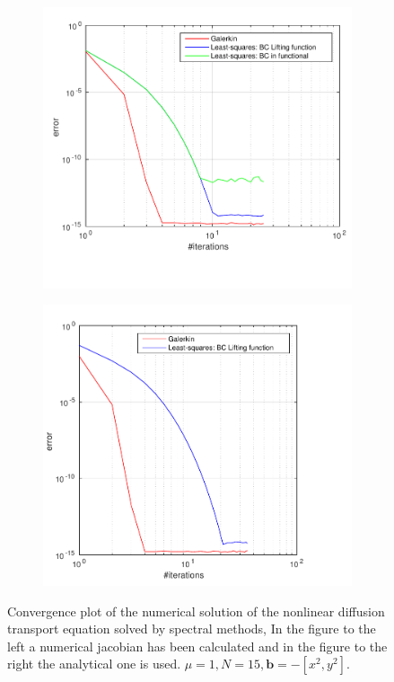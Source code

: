 \begin{figure}[h]
  \centering
  \begin{subfigure}[b]{0.48\textwidth}
	\includegraphics[width=\textwidth]{Figures/Spec_Nonlin_Convergence_Jnum.pdf}
  \end{subfigure}%
  \quad
  \begin{subfigure}[b]{0.48\textwidth}
	\includegraphics[width=\textwidth]{Figures/Spec_Nonlin_Convergence.pdf}
  \end{subfigure}%
  \vspace{-0.1\baselineskip}
	\caption{Convergence plot of the numerical solution of the nonlinear diffusion transport equation solved by spectral methods, In the figure to the left a numerical jacobian has been calculated and in the figure to the right the analytical one is used. $\mu = 1,N=15,\mathbf{b} = -[x^2,y^2]$.}
  \label{fig:convergenceNonlinear}
\end{figure}
%
